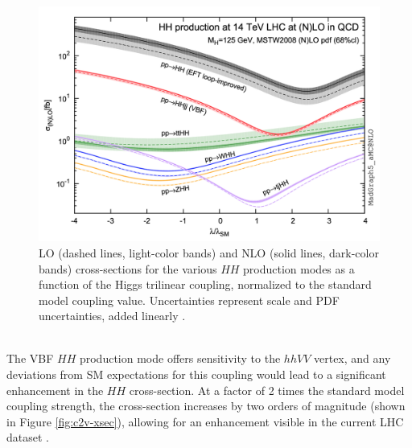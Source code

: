 \begin{figure}[!ht]
    \centering
    \includegraphics[width=.7\textwidth]{chapters/chapter1_theory/images/klambda-xsec.png}
    \caption[LO and NLO cross-sections for the various $HH$ production modes as a function of the Higgs trilinear coupling]{\gls{LO} (dashed lines, light-color bands) and \gls{NLO} (solid lines, dark-color bands) cross-sections for the various $HH$ production modes as a function of the Higgs trilinear coupling, normalized to the standard model coupling value. Uncertainties represent scale and PDF uncertainties, added linearly \cite{klambda-xsec}.}
    \label{fig:klambda-xsec}
\end{figure}

\\
\indent The \gls{VBF} $HH$ production mode offers sensitivity to the $hhVV$ vertex, and any deviations from \gls{SM} expectations for this coupling would lead to a significant enhancement in the $HH$ cross-section. At a factor of 2 times the standard model coupling strength, the cross-section increases by two orders of magnitude (shown in Figure \ref{fig:c2v-xsec}), allowing for an enhancement visible in the current \gls{LHC} dataset \cite{vbfhh}.


